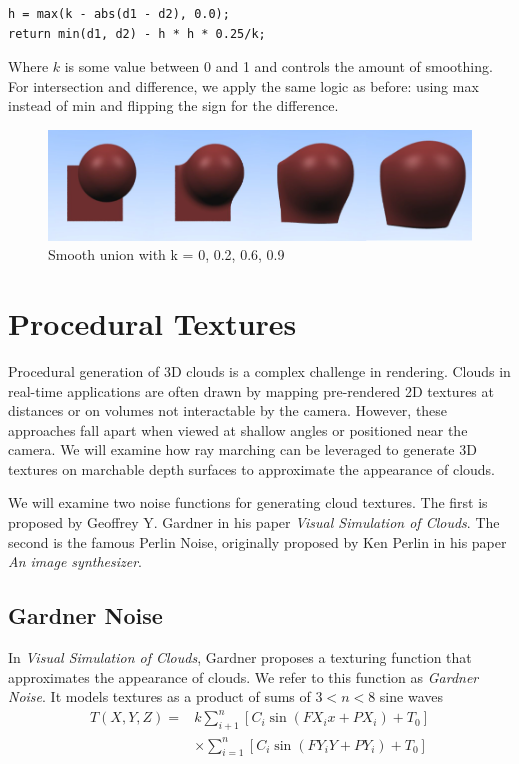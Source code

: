 \documentclass[sigconf, nonacm]{acmart}
\begin{document}
\begin{lstlisting}
h = max(k - abs(d1 - d2), 0.0);
return min(d1, d2) - h * h * 0.25/k;
\end{lstlisting}

Where $k$ is some value between 0 and 1 and controls the amount of smoothing. For intersection and difference, we apply the same logic as before: using max instead of min and flipping the sign for the difference.

\begin{figure}
  \includegraphics[width=\linewidth]{images/smoothing.png}
  \caption{Smooth union with k = 0, 0.2, 0.6, 0.9}
\end{figure}

\section{Procedural Textures}

Procedural generation of 3D clouds is a complex challenge in rendering. Clouds in real-time applications are often drawn by mapping pre-rendered 2D textures at distances or on volumes not interactable by the camera. However, these approaches fall apart when viewed at shallow angles or positioned near the camera. We will examine how ray marching can be leveraged to generate 3D textures on marchable depth surfaces to approximate the appearance of clouds.

We will examine two noise functions for generating cloud textures. The first is proposed by Geoffrey Y. Gardner in his paper \textit{Visual Simulation of Clouds}. The second is the famous Perlin Noise, originally proposed by Ken Perlin in his paper \textit{An image synthesizer}.

\subsection{Gardner Noise}

In \textit{Visual Simulation of Clouds}, Gardner proposes a texturing function that approximates the appearance of clouds. We refer to this function as \textit{Gardner Noise}. It models textures as a product of sums of $3<n<8$ sine waves
\begin{align*}
    T(X,Y,Z)=&k\sum_{i+1}^n[C_i\sin (FX_ix+PX_i)+T_0]\\
    &\times\sum_{i=1}^n[C_i\sin (FY_iY+PY_i)+T_0]
\end{align*}
\end{document}
